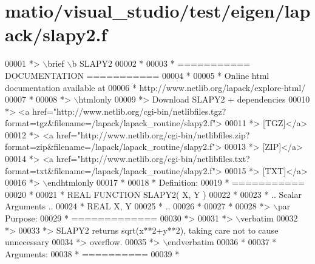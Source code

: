 \hypertarget{matio_2visual__studio_2test_2eigen_2lapack_2slapy2_8f_source}{}\section{matio/visual\+\_\+studio/test/eigen/lapack/slapy2.f}
\label{matio_2visual__studio_2test_2eigen_2lapack_2slapy2_8f_source}

\begin{DoxyCode}
00001 \textcolor{comment}{*> \(\backslash\)brief \(\backslash\)b SLAPY2}
00002 \textcolor{comment}{*}
00003 \textcolor{comment}{*  =========== DOCUMENTATION ===========}
00004 \textcolor{comment}{*}
00005 \textcolor{comment}{* Online html documentation available at }
00006 \textcolor{comment}{*            http://www.netlib.org/lapack/explore-html/ }
00007 \textcolor{comment}{*}
00008 \textcolor{comment}{*> \(\backslash\)htmlonly}
00009 \textcolor{comment}{*> Download SLAPY2 + dependencies }
00010 \textcolor{comment}{*> <a
       href="http://www.netlib.org/cgi-bin/netlibfiles.tgz?format=tgz&filename=/lapack/lapack\_routine/slapy2.f"> }
00011 \textcolor{comment}{*> [TGZ]</a> }
00012 \textcolor{comment}{*> <a
       href="http://www.netlib.org/cgi-bin/netlibfiles.zip?format=zip&filename=/lapack/lapack\_routine/slapy2.f"> }
00013 \textcolor{comment}{*> [ZIP]</a> }
00014 \textcolor{comment}{*> <a
       href="http://www.netlib.org/cgi-bin/netlibfiles.txt?format=txt&filename=/lapack/lapack\_routine/slapy2.f"> }
00015 \textcolor{comment}{*> [TXT]</a>}
00016 \textcolor{comment}{*> \(\backslash\)endhtmlonly }
00017 \textcolor{comment}{*}
00018 \textcolor{comment}{*  Definition:}
00019 \textcolor{comment}{*  ===========}
00020 \textcolor{comment}{*}
00021 \textcolor{comment}{*       REAL             FUNCTION SLAPY2( X, Y )}
00022 \textcolor{comment}{* }
00023 \textcolor{comment}{*       .. Scalar Arguments ..}
00024 \textcolor{comment}{*       REAL               X, Y}
00025 \textcolor{comment}{*       ..}
00026 \textcolor{comment}{*  }
00027 \textcolor{comment}{*}
00028 \textcolor{comment}{*> \(\backslash\)par Purpose:}
00029 \textcolor{comment}{*  =============}
00030 \textcolor{comment}{*>}
00031 \textcolor{comment}{*> \(\backslash\)verbatim}
00032 \textcolor{comment}{*>}
00033 \textcolor{comment}{*> SLAPY2 returns sqrt(x**2+y**2), taking care not to cause unnecessary}
00034 \textcolor{comment}{*> overflow.}
00035 \textcolor{comment}{*> \(\backslash\)endverbatim}
00036 \textcolor{comment}{*}
00037 \textcolor{comment}{*  Arguments:}
00038 \textcolor{comment}{*  ==========}
00039 \textcolor{comment}{*}

\end{DoxyCode}
